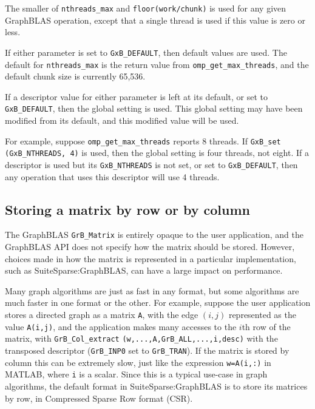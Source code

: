 \documentclass[12pt]{article}
\begin{document}
The smaller of \verb'nthreads_max' and \verb'floor(work/chunk)' is used for any
given GraphBLAS operation, except that a single thread is used if this value is
zero or less.

If either parameter is set to \verb'GxB_DEFAULT', then default values are used.
The default for \verb'nthreads_max' is the return value from
\verb'omp_get_max_threads', and the default chunk size is currently 65,536.

If a descriptor value for either parameter is left at its default, or set to
\verb'GxB_DEFAULT', then the global setting is used.  This global setting may
have been modified from its default, and this modified value will be used.

For example, suppose \verb'omp_get_max_threads' reports 8 threads.  If \newline
\verb'GxB_set (GxB_NTHREADS, 4)' is used, then the global setting is four
threads, not eight.  If a descriptor is used but its \verb'GxB_NTHREADS' is not
set, or set to \verb'GxB_DEFAULT', then any operation that uses this descriptor
will use 4 threads.

\subsection{Storing a matrix by row or by column}

The GraphBLAS \verb'GrB_Matrix' is entirely opaque to the user application, and
the GraphBLAS API does not specify how the matrix should be stored.  However,
choices made in how the matrix is represented in a particular implementation,
such as SuiteSparse:GraphBLAS, can have a large impact on performance.

Many graph algorithms are just as fast in any format, but some algorithms are
much faster in one format or the other.  For example, suppose the user
application stores a directed graph as a matrix \verb'A', with the edge $(i,j)$
represented as the value \verb'A(i,j)', and the application makes many accesses
to the $i$th row of the matrix, with \verb'GrB_Col_extract'
\verb'(w,...,A,GrB_ALL,...,i,desc)' with the transposed descriptor
(\verb'GrB_INP0' set to \verb'GrB_TRAN').  If the matrix is stored by column
this can be extremely slow, just like the expression \verb'w=A(i,:)' in MATLAB,
where \verb'i' is a scalar.  Since this is a typical use-case in graph
algorithms, the default format in SuiteSparse:GraphBLAS is to store its
matrices by row, in Compressed Sparse Row format (CSR).
\end{document}
